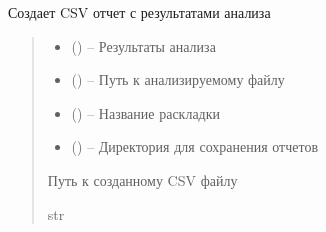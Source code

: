 \documentclass[a4paper,11pt,russian,openany,oneside]{sphinxmanual}
\begin{document}
\begin{savenotes}\begin{fulllineitems}
\label{\detokenize{_autosummary/data_module.make_export_file:data_module.make_export_file.create_csv_report}}
\pysigstartsignatures
\pysiglinewithargsret
{}
{\sphinxparamcomma {}\sphinxparamcomma {}\sphinxparamcomma {}}
{}
\pysigstopsignatures
\sphinxAtStartPar
Создает CSV отчет с результатами анализа
\begin{quote}\begin{description}
\begin{itemize}
\item {} 
\sphinxAtStartPar
{} (\sphinxstyleliteralemphasis{\sphinxupquote{{[}}}\sphinxstyleliteralemphasis{\sphinxupquote{, }}\sphinxstyleliteralemphasis{\sphinxupquote{{]}}}) – Результаты анализа

\item {} 
\sphinxAtStartPar
{} () – Путь к анализируемому файлу

\item {} 
\sphinxAtStartPar
{} () – Название раскладки

\item {} 
\sphinxAtStartPar
{} () – Директория для сохранения отчетов

\end{itemize}

\sphinxAtStartPar
Путь к созданному CSV файлу

\sphinxAtStartPar
str

\end{description}\end{quote}

\end{fulllineitems}\end{savenotes}
\end{document}
